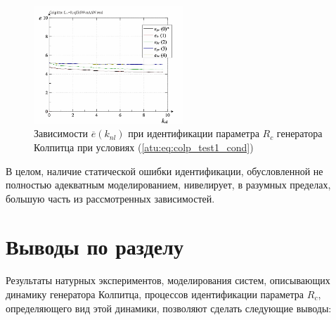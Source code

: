 \begin{figure}[htb!]
  \centerline{\includegraphics[width=0.50\textwidth]{p/r/colp_real_id-p_k_nl_d_0.png} }
  \caption{Зависимости $\overline{e}(k_{nl})$ при идентификации параметра $R_c$ генератора Колпитца при условиях (\ref{atu:eq:colp_test1_cond})}
  \label{atu:f:colp_real_id_p_k_nl_d_0}
\end{figure}
%
%

В целом, наличие статической ошибки идентификации,
обусловленной не полностью адекватным моделированием,
нивелирует, в разумных пределах,
большую часть из рассмотренных зависимостей.




\section{Выводы по разделу \thechapter}  %

Результаты натурных
экспериментов,
моделирования систем, описывающих динамику генератора Колпитца,
процессов идентификации параметра $R_c$, определяющего вид этой динамики,
позволяют сделать следующие выводы:

